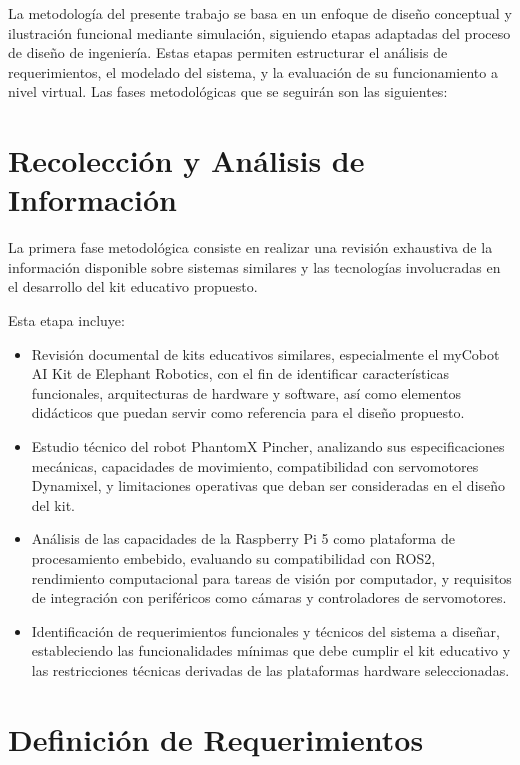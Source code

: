 La metodología del presente trabajo se basa en un enfoque de diseño conceptual y ilustración funcional mediante simulación, siguiendo etapas adaptadas del proceso de diseño de ingeniería. Estas etapas permiten estructurar el análisis de requerimientos, el modelado del sistema, y la evaluación de su funcionamiento a nivel virtual. Las fases metodológicas que se seguirán son las siguientes:

\section{Recolección y Análisis de Información}

La primera fase metodológica consiste en realizar una revisión exhaustiva de la información disponible sobre sistemas similares y las tecnologías involucradas en el desarrollo del kit educativo propuesto.

Esta etapa incluye:

\begin{itemize}
    \item Revisión documental de kits educativos similares, especialmente el myCobot AI Kit de Elephant Robotics, con el fin de identificar características funcionales, arquitecturas de hardware y software, así como elementos didácticos que puedan servir como referencia para el diseño propuesto.
    
    \item Estudio técnico del robot PhantomX Pincher, analizando sus especificaciones mecánicas, capacidades de movimiento, compatibilidad con servomotores Dynamixel, y limitaciones operativas que deban ser consideradas en el diseño del kit.
    
    \item Análisis de las capacidades de la Raspberry Pi 5 como plataforma de procesamiento embebido, evaluando su compatibilidad con ROS2, rendimiento computacional para tareas de visión por computador, y requisitos de integración con periféricos como cámaras y controladores de servomotores.
    
    \item Identificación de requerimientos funcionales y técnicos del sistema a diseñar, estableciendo las funcionalidades mínimas que debe cumplir el kit educativo y las restricciones técnicas derivadas de las plataformas hardware seleccionadas.
\end{itemize}

\section{Definición de Requerimientos}

